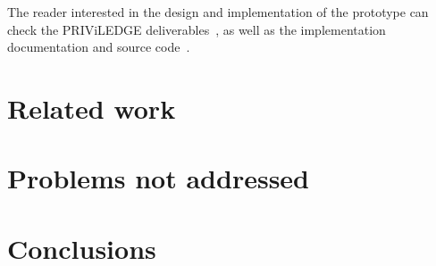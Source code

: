 \documentclass[11pt,a4paper]{article}
\begin{document}
The reader interested in the design and implementation of the prototype can
check the PRIViLEDGE deliverables~\cite{priviledge_d11, priviledge_d12,
  priviledge_d41}, as well as the implementation documentation and source
code~\cite{dsu-repo2021}.

\section{Related work}
\label{sec:related-work}

\section{Problems not addressed}
\label{sec:probl-not-addr}






\section{Conclusions}
\label{sec:conclusions}



\end{document}
